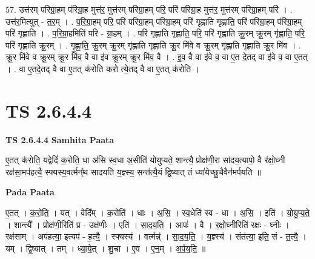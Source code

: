 \documentclass[17pt]{extarticle}
\begin{document}
57. उत्त॑रम् परिग्रा॒हम् प॑रिग्रा॒ह मुत्त॑र॒ मुत्त॑रम् परिग्रा॒हम् परि॒ परि॑ परिग्रा॒ह मुत्त॑र॒ मुत्त॑रम् परिग्रा॒हम् परि॑ । . उत्त॑र॒मित्युत् - त॒र॒म् । . प॒रि॒ग्रा॒हम् परि॒ परि॑ परिग्रा॒हम् प॑रिग्रा॒हम् परि॑ गृह्णाति गृह्णाति॒ परि॑ परिग्रा॒हम् प॑रिग्रा॒हम् परि॑ गृह्णाति । . प॒रि॒ग्रा॒हमिति॑ परि - ग्रा॒हम् । . परि॑ गृह्णाति गृह्णाति॒ परि॒ परि॑ गृह्णाति क्रू॒रम् क्रू॒रम् गृ॑ह्णाति॒ परि॒ परि॑ गृह्णाति क्रू॒रम् । . गृ॒ह्णा॒ति॒ क्रू॒रम् क्रू॒रम् गृ॑ह्णाति गृह्णाति क्रू॒र मि॑वे व क्रू॒रम् गृ॑ह्णाति गृह्णाति क्रू॒र मि॑व । . क्रू॒र मि॑वे व क्रू॒रम् क्रू॒र मि॑व॒ वै वा इ॑व क्रू॒रम् क्रू॒र मि॑व॒ वै । . इ॒व॒ वै वा इ॑वे व॒ वा ए॒त दे॒तद् वा इ॑वे व॒ वा ए॒तत् । . वा ए॒तदे॒तद् वै वा ए॒तत् क॑रोति करो त्ये॒तद् वै वा ए॒तत् क॑रोति । \newline
\pagebreak
{}

\section{ TS 2.6.4.4 }

\textbf{TS 2.6.4.4 } \newline
\textbf{Samhita Paata} \newline

ए॒तत् क॑रोति॒ यद्वेदिं॑ क॒रोति॒ धा अ॑सि स्व॒धा अ॒सीति॑ योयुप्यते॒ शान्त्यै॒ प्रोक्ष॑णी॒रा सा॑दय॒त्यापो॒ वै र॑क्षो॒घ्नी रक्ष॑सा॒मप॑हत्यै॒ स्फ्यस्य॒वर्त्मन्᳚थ सादयति य॒ज्ञ्स्य॒ सन्त॑त्यै॒यं द्वि॒ष्यात् तं ध्या॑येच्छु॒चैवैन॑मर्पयति ॥ \newline

\textbf{Pada Paata} \newline

ए॒तत् । क॒रो॒ति॒ । यत् । वेदि᳚म् । क॒रोति॑ । धाः । अ॒सि॒ । स्व॒धेति॑ स्व - धा । अ॒सि॒ । इति॑ । यो॒यु॒प्य॒ते॒ । शान्त्यै᳚ । प्रोक्ष॑णी॒रिति॑ प्र - उक्ष॑णीः । एति॑ । सा॒द॒य॒ति॒ । आपः॑ । वै । र॒क्षो॒घ्नीरिति॑ रक्षः - घ्नीः । रक्ष॑साम् । अप॑हत्या॒ इत्यप॑ - ह॒त्यै॒ । स्फ्यस्य॑ । वर्त्मन्न्॑ । सा॒द॒य॒ति॒ । य॒ज्ञ्स्य॑ । संत॑त्या॒ इति॒ सं - त॒त्यै॒ । यम् । द्वि॒ष्यात् । तम् । ध्या॒ये॒त् । शु॒चा । ए॒व । ए॒न॒म् । अ॒र्प॒य॒ति॒ ॥  \newline
\end{document}
